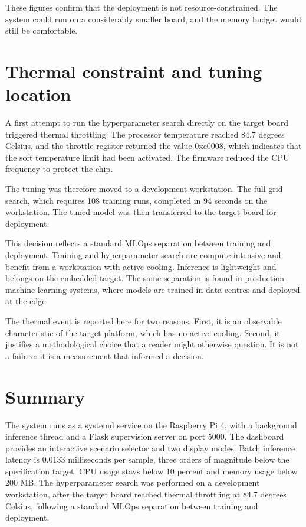 These figures confirm that the deployment is not resource-constrained. The system could run on a considerably smaller board, and the memory budget would still be comfortable.

\section{Thermal constraint and tuning location}

A first attempt to run the hyperparameter search directly on the target board triggered thermal throttling. The processor temperature reached 84.7 degrees Celsius, and the throttle register returned the value 0xe0008, which indicates that the soft temperature limit had been activated. The firmware reduced the CPU frequency to protect the chip.

The tuning was therefore moved to a development workstation. The full grid search, which requires 108 training runs, completed in 94 seconds on the workstation. The tuned model was then transferred to the target board for deployment.

This decision reflects a standard MLOps separation between training and deployment. Training and hyperparameter search are compute-intensive and benefit from a workstation with active cooling. Inference is lightweight and belongs on the embedded target. The same separation is found in production machine learning systems, where models are trained in data centres and deployed at the edge.

The thermal event is reported here for two reasons. First, it is an observable characteristic of the target platform, which has no active cooling. Second, it justifies a methodological choice that a reader might otherwise question. It is not a failure: it is a measurement that informed a decision.

\section{Summary}

The system runs as a systemd service on the Raspberry Pi 4, with a background inference thread and a Flask supervision server on port 5000. The dashboard provides an interactive scenario selector and two display modes. Batch inference latency is 0.0133 milliseconds per sample, three orders of magnitude below the specification target. CPU usage stays below 10 percent and memory usage below 200 MB. The hyperparameter search was performed on a development workstation, after the target board reached thermal throttling at 84.7 degrees Celsius, following a standard MLOps separation between training and deployment.